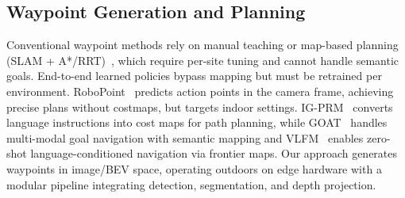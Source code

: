 \documentclass{article}
\begin{document}
\subsection{Waypoint Generation and Planning}
Conventional waypoint methods rely on manual teaching or map-based planning (SLAM + A*/RRT)~\citep{campos2021orbslam3,pfrommer2019tagslam}, which require per-site tuning and cannot handle semantic goals. End-to-end learned policies bypass mapping but must be retrained per environment. RoboPoint~\citep{yuan2025robopoint} predicts action points in the camera frame, achieving precise plans without costmaps, but targets indoor settings. IG-PRM~\citep{bao2025igprm} converts language instructions into cost maps for path planning, while GOAT~\citep{chang2024goat} handles multi-modal goal navigation with semantic mapping and VLFM~\citep{yokoyama2024vlfm} enables zero-shot language-conditioned navigation via frontier maps. Our approach generates waypoints in image/BEV space, operating outdoors on edge hardware with a modular pipeline integrating detection, segmentation, and depth projection.
\end{document}
